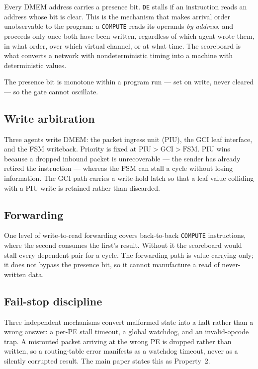 \documentclass[journal,10pt]{IEEEtran}
\newcommand{\sv}[1]{\texttt{#1}}
\begin{document}
Every DMEM address carries a presence bit. \sv{DE} stalls if an instruction
reads an address whose bit is clear. This is the mechanism that makes
arrival order unobservable to the program: a \sv{COMPUTE} reads its operands
\emph{by address}, and proceeds only once both have been written, regardless
of which agent wrote them, in what order, over which virtual channel, or at
what time. The scoreboard is what converts a network with nondeterministic
timing into a machine with deterministic values.

The presence bit is monotone within a program run --- set on write, never
cleared --- so the gate cannot oscillate.

\subsection{Write arbitration}

Three agents write DMEM: the packet ingress unit (PIU), the GCI leaf
interface, and the FSM writeback. Priority is fixed at
$\text{PIU} > \text{GCI} > \text{FSM}$. PIU wins because a dropped inbound
packet is unrecoverable --- the sender has already retired the instruction ---
whereas the FSM can stall a cycle without losing information. The GCI path
carries a write-hold latch so that a leaf value colliding with a PIU write is
retained rather than discarded.

\subsection{Forwarding}

One level of write-to-read forwarding covers back-to-back \sv{COMPUTE}
instructions, where the second consumes the first's result. Without it the
scoreboard would stall every dependent pair for a cycle. The forwarding path
is value-carrying only; it does not bypass the presence bit, so it cannot
manufacture a read of never-written data.

\subsection{Fail-stop discipline}

Three independent mechanisms convert malformed state into a halt rather than
a wrong answer: a per-PE stall timeout, a global watchdog, and an
invalid-opcode trap. A misrouted packet arriving at the wrong PE is dropped
rather than written, so a routing-table error manifests as a watchdog
timeout, never as a silently corrupted result. The main paper states this as
Property~2.
\end{document}

